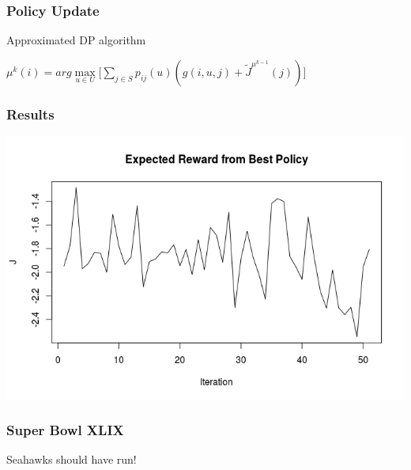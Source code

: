 \documentclass{beamer}
\begin{document}
\begin{frame}
\frametitle{Policy Update}
\begin{block}{Approximated DP algorithm}
\begin{center}
$\mu^{k}(i) = arg\max\limits_{u \in U} \Big[ \sum\limits_{j \in S} p_{ij}(u)(g(i,u,j) +  \widetilde{J}^{\mu^{k-1}}(j))\Big]$
\end{center}
\end{block}
\end{frame}

\begin{frame}
\frametitle{Results}
\includegraphics[scale=0.65]{plot}
\end{frame}

\begin{frame}
\frametitle{Super Bowl XLIX}
\begin{center}
Seahawks should have run!
\end{center}
\end{frame}
\end{document}
